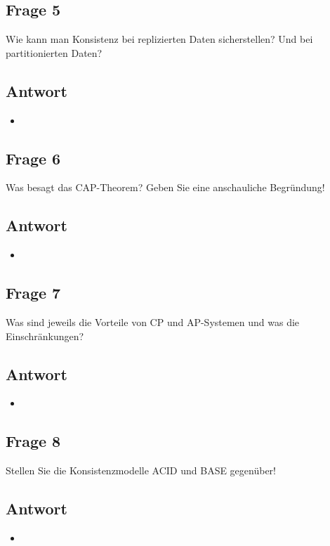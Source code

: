\subsection*{Frage 5}
Wie kann man Konsistenz bei replizierten Daten sicherstellen? Und bei partitionierten Daten?
\subsection*{Antwort}
\begin{itemize}
	\item 
\end{itemize}
\subsection*{Frage 6}
Was besagt das CAP-Theorem? Geben Sie eine anschauliche Begründung!
\subsection*{Antwort}
\begin{itemize}
	\item 
\end{itemize}
\subsection*{Frage 7}
Was sind jeweils die Vorteile von CP und AP-Systemen und was die Einschränkungen?
\subsection*{Antwort}
\begin{itemize}
	\item 
\end{itemize}
\subsection*{Frage 8}
Stellen Sie die Konsistenzmodelle ACID und BASE gegenüber!
\subsection*{Antwort}
\begin{itemize}
	\item 
\end{itemize}
